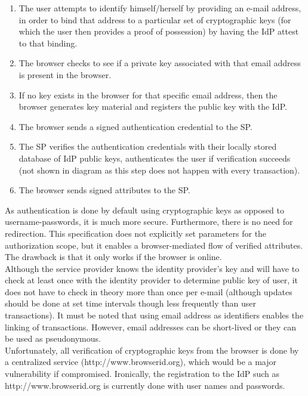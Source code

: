 \begin{enumerate}
\item The user attempts to identify himself/herself by providing an e-mail address, in order to bind that address to a particular set of cryptographic keys (for which the user then provides a proof of possession) by having the IdP attest to that binding.
\item The browser checks to see if a private key associated with that email address is present in the browser.
\item If no key exists in the browser for that specific email address, then the browser generates key material and registers the public key with the IdP.
\item The browser sends a signed authentication credential to the SP.
\item The SP verifies the authentication credentials with their locally stored database of IdP public keys, authenticates the user if verification succeeds (not shown in diagram as this step does not happen with every transaction).
\item The browser sends signed attributes to the SP.
\end{enumerate}

As authentication is done by default using cryptographic keys as opposed to username-passwords, it is much more secure. Furthermore, there is no need for redirection. This specification does not explicitly set parameters for the authorization scope, but it enables a browser-mediated flow of verified attributes. The drawback is that it only works if the browser is online.\\

Although the service provider knows the identity provider's key and will have to check at least once with the identity provider to determine public key of user, it does not have to check in theory more than once per e-mail (although updates should be done at set time intervals though less frequently than user transactions). It must be noted that using email address as identifiers enables the linking of transactions. However, email addresses can be short-lived or they can be used as pseudonymous.\\

Unfortunately, all verification of cryptographic keys from the browser is done by a centralized service (http://www.browserid.org),
which would be a major vulnerability if compromised. Ironically, the registration to the IdP such as http://www.browserid.org is currently done with user names and passwords.\\


